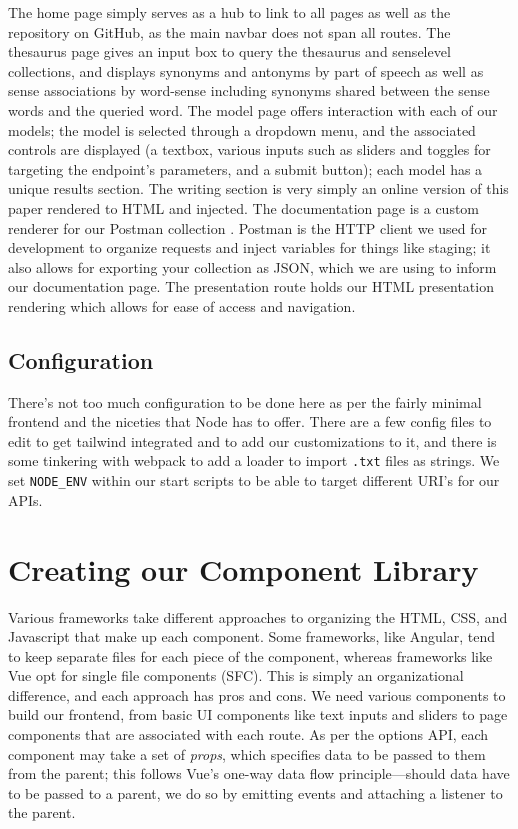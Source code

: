 \documentclass[11pt, twoside, reqno]{book}
\begin{document}
The home page simply serves as a hub to link to all pages as well as the repository on GitHub, as the main navbar does not span all routes. The thesaurus page gives an input box to query the thesaurus and senselevel collections, and displays synonyms and antonyms by part of speech as well as sense associations by word-sense including synonyms shared between the sense words and the queried word. The model page offers interaction with each of our models; the model is selected through a dropdown menu, and the associated controls are displayed (a textbox, various inputs such as sliders and toggles for targeting the endpoint's parameters, and a submit button); each model has a unique results section. The writing section is very simply an online version of this paper rendered to HTML and injected. The documentation page is a custom renderer for our Postman collection \cite{PostmanT86:online}. Postman is the HTTP client we used for development to organize requests and inject variables for things like staging; it also allows for exporting your collection as JSON, which we are using to inform our documentation page. The presentation route holds our HTML presentation rendering which allows for ease of access and navigation.

\subsection{Configuration}

There's not too much configuration to be done here as per the fairly minimal frontend and the niceties that Node has to offer. There are a few config files to edit to get tailwind integrated and to add our customizations to it, and there is some tinkering with webpack \cite{webpack35:online} to add a loader to import \texttt{.txt} files as strings. We set \texttt{NODE\_ENV} within our start scripts to be able to target different URI's for our APIs.

\section{Creating our Component Library}

Various frameworks take different approaches to organizing the HTML, CSS, and Javascript that make up each component. Some frameworks, like Angular, tend to keep separate files for each piece of the component, whereas frameworks like Vue opt for single file components (SFC). This is simply an organizational difference, and each approach has pros and cons. We need various components to build our frontend, from basic UI components like text inputs and sliders to page components that are associated with each route. As per the options API, each component may take a set of \textit{props}, which specifies data to be passed to them from the parent; this follows Vue's one-way data flow principle—should data have to be passed to a parent, we do so by emitting events and attaching a listener to the parent.
\end{document}

